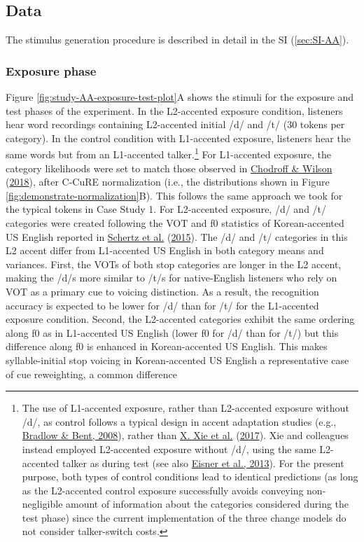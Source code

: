 \documentclass[
  11pt,
  english,
  man,floatsintext]{apa6}
\begin{document}
\hypertarget{data-1}{%
\subsection{Data}\label{data-1}}

The stimulus generation procedure is described in detail in the SI (\ref{sec:SI-AA}).

\hypertarget{exposure-phase-1}{%
\subsubsection{Exposure phase}\label{exposure-phase-1}}

Figure \ref{fig:study-AA-exposure-test-plot}A shows the stimuli for the exposure and test phases of the experiment. In the L2-accented exposure condition, listeners hear word recordings containing L2-accented initial /d/ and /t/ (30 tokens per category). In the control condition with L1-accented exposure, listeners hear the same words but from an L1-accented talker.\footnote{The use of L1-accented exposure, rather than L2-accented exposure without /d/, as control follows a typical design in accent adaptation studies (e.g., \protect\hyperlink{ref-bradlow-bent2008}{Bradlow \& Bent, 2008}), rather than \protect\hyperlink{ref-xie2016jep}{X. Xie et al.} (\protect\hyperlink{ref-xie2016jep}{2017}). Xie and colleagues instead employed L2-accented exposure without /d/, using the same L2-accented talker as during test (see also \protect\hyperlink{ref-eisner2013}{Eisner et al., 2013}). For the present purpose, both types of control conditions lead to identical predictions (as long as the L2-accented control exposure successfully avoids conveying non-negligible amount of information about the categories considered during the test phase) since the current implementation of the three change models do not consider talker-switch costs.} For L1-accented exposure, the category likelihoods were set to match those observed in \protect\hyperlink{ref-chodroff-wilson2018}{Chodroff \& Wilson} (\protect\hyperlink{ref-chodroff-wilson2018}{2018}), after C-CuRE normalization (i.e., the distributions shown in Figure \ref{fig:demonstrate-normalization}B). This follows the same approach we took for the typical tokens in Case Study 1. For L2-accented exposure, /d/ and /t/ categories were created following the VOT and f0 statistics of Korean-accented US English reported in \protect\hyperlink{ref-schertz2015}{Schertz et al.} (\protect\hyperlink{ref-schertz2015}{2015}). The /d/ and /t/ categories in this L2 accent differ from L1-accented US English in both category means and variances. First, the VOTs of both stop categories are longer in the L2 accent, making the /d/s more similar to /t/s for native-English listeners who rely on VOT as a primary cue to voicing distinction. As a result, the recognition accuracy is expected to be lower for /d/ than for /t/ for the L1-accented exposure condition. Second, the L2-accented categories exhibit the same ordering along f0 as in L1-accented US English (lower f0 for /d/ than for /t/) but this difference along f0 is enhanced in Korean-accented US English. This makes syllable-initial stop voicing in Korean-accented US English a representative case of cue reweighting, a common difference 
\end{document}
